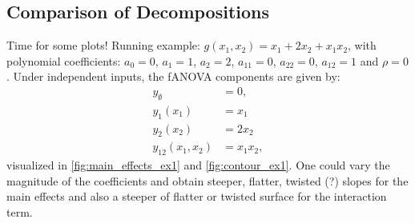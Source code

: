 
\subsection{Comparison of Decompositions}
Time for some plots!
Running example: $g(x_1, x_2) = x_1 + 2 x_2 + x_1 x_2$, with polynomial coefficients: $a_0 = 0$, $a_1 = 1$, $a_2 = 2$, $a_{11} = 0$, $a_{22} = 0$, $a_{12} = 1$ and $\rho = 0$.
Under independent inputs, the fANOVA components are given by:
\begin{align*}
y_{\emptyset} &= 0, \\
y_1(x_1) &= x_1\\
y_2(x_2) &= 2x_2\\
y_{12}(x_1, x_2) &= x_1x_2,
\end{align*}
visualized in \autoref{fig:main_effects_ex1} and \autoref{fig:contour_ex1}. One could vary the magnitude of the coefficients and obtain steeper, flatter, twisted (?) slopes for the main effects and also a steeper of flatter or twisted surface for the interaction term.
